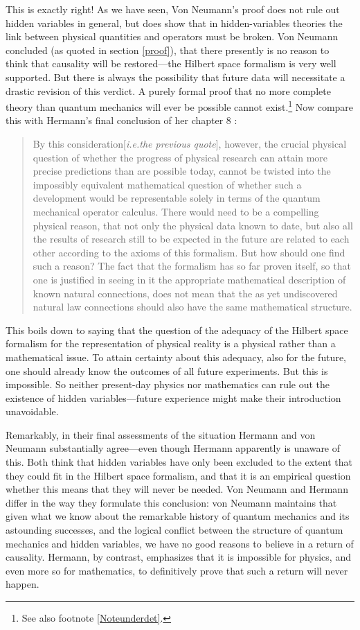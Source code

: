 \documentclass[12pt]{article}
\begin{document}
This is exactly right! As we have seen, Von Neumann's proof does not rule out hidden variables in general, but does show that in hidden-variables theories the link between physical quantities and operators must be broken. Von Neumann concluded (as quoted in section \ref{proof}), that there presently is no reason to think that causality will be restored---the Hilbert space formalism is very well supported. But there is always the possibility that future data will necessitate a drastic revision of this verdict. A purely formal proof that no more complete theory than quantum mechanics will ever be possible cannot exist.\footnote{See also footnote \ref{Noteunderdet}.} Now compare this with Hermann's final conclusion of her chapter 8 \cite[p.\@ 270]{crull}:
\begin{quote}
By this consideration[\emph{i.e.\@ the previous quote}], however, the crucial physical question of whether the
progress of physical research can attain more precise predictions than are possible
today, cannot be twisted into the impossibly equivalent mathematical question of
whether such a development would be representable solely in terms of the quantum
mechanical operator calculus. There would need to be a compelling physical reason,
that not only the physical data known to date, but also all the results of research still
to be expected in the future are related to each other according to the axioms of
this formalism. But how should one find such a reason? The fact that the formalism
has so far proven itself, so that one is justified in seeing in it the appropriate
mathematical description of known natural connections, does not mean that the as
yet undiscovered natural law connections should also have the same mathematical
structure.
\end{quote}

This boils down to saying that the question of the adequacy of the Hilbert space formalism for the representation of physical reality is a physical rather than a mathematical issue. To attain certainty about this adequacy, also for the future, one should already know the outcomes of all future experiments. But this is impossible. So neither present-day physics nor mathematics can rule out the existence of hidden variables---future experience might make their introduction unavoidable.

Remarkably, in their final assessments of the situation Hermann and von Neumann substantially agree---even though Hermann apparently is unaware of this. Both think that hidden variables have only been excluded to the extent that they could fit in the Hilbert space formalism, and that it is an empirical question whether this means that they will never be needed. Von Neumann and Hermann differ in the way they formulate this conclusion: von Neumann maintains that given what we know about the remarkable history of quantum mechanics and its astounding successes, and the logical conflict between the structure of quantum mechanics and hidden variables, we have no good reasons to believe in a return of causality. Hermann, by contrast, emphasizes that it is impossible for physics, and even more so for mathematics, to definitively prove that such a return will never happen.
\end{document}
